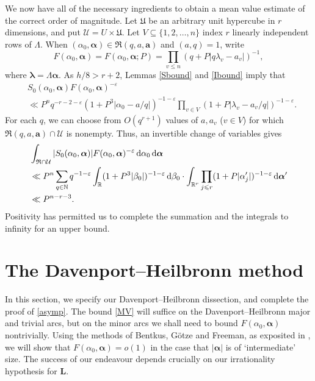 \documentclass[12pt,reqno]{amsart}
\theoremstyle{definition}
\theoremstyle{remark}
\numberwithin{equation}{section}
\begin{document}
We now have all of the necessary ingredients to obtain a mean value estimate of the correct order of magnitude. Let ${\mathfrak U}$ be an arbitrary unit hypercube in $r$ dimensions, and put ${\mathcal U} = U \times {\mathfrak U}$. Let $V \subseteq \{1,2,\ldots,n\}$ index $r$ linearly independent rows of ${{\Lambda}}$. When $({{\alpha}}_0,{\boldsymbol{{\alpha}}}) \in {\mathfrak R}(q,a,{\mathbf a})$ and $(a,q) = 1$, write
\[
F({{\alpha}}_0, {\boldsymbol{{\alpha}}}) = F({{\alpha}}_0, {\boldsymbol{{\alpha}}}; P) = \prod_{v {\leqslant} n} (q+ P | q {{\lambda}}_v - a_v|)^{-1}, 
\]
where ${{\boldsymbol {{\lambda}}}} = {{\Lambda}} {\boldsymbol{{\alpha}}}$. As $h/8 > r+2$, Lemmas \ref{Sbound} and \ref{Ibound} imply that
\begin{align*}
&S_0({{\alpha}}_0, {\boldsymbol{{\alpha}}}) F({{\alpha}}_0,{\boldsymbol{{\alpha}}})^{-{\varepsilon}} \\
&\ll P^n q^{-r-2-{\varepsilon}} (1+P^3|{{\alpha}}_0 - a/q|)^{-1-{\varepsilon}} 
\prod_{v \in  V} (1+ P|{{\lambda}}_v - a_v/q|)^{-1-{\varepsilon}}.
\end{align*}
For each $q$, we can choose from $O(q^{r+1})$ values of $a, a_v$ ($v \in V$) for which ${\mathfrak R}(q,a,{\mathbf a}) \cap {\mathcal U}$ is nonempty. Thus, an invertible change of variables gives
\begin{align}
\notag &\int_{{\mathfrak R} \cap {\mathcal U}} |S_0({{\alpha}}_0,{\boldsymbol{{\alpha}}})| F({{\alpha}}_0, {\boldsymbol{{\alpha}}})^{-{\varepsilon}} {{\,{\rm d}}} {{\alpha}}_0 {{\,{\rm d}}} {\boldsymbol{{\alpha}}} \\
\notag &\ll P^n \sum_{q \in {\mathbb N}} q^{-1-{\varepsilon}} \int_{\mathbb R} (1+P^3|{{\beta}}_0|)^{-1-{\varepsilon}} {{\,{\rm d}}} {{\beta}}_0 \cdot
\int_{{\mathbb R}^r} \prod_{j {\leqslant} r} (1+P|{{\alpha}}'_j|)^{-1-{\varepsilon}} {{\,{\rm d}}} {\boldsymbol{{\alpha}}}' \\
\label{MV} &\ll P^{n-r-3}.
\end{align}
Positivity has permitted us to complete the summation and the integrals to infinity for an upper bound.

\section{The Davenport--Heilbronn method}
\label{DHmethod}

In this section, we specify our Davenport--Heilbronn dissection, and complete the proof of \eqref{asymp}. The bound \eqref{MV} will suffice on the Davenport--Heilbronn major and trivial arcs, but on the minor arcs we shall need to bound $F({{\alpha}}_0,{\boldsymbol{{\alpha}}})$ nontrivially. Using the methods of Bentkus, G\"otze and Freeman, as exposited in \cite[Lemmas 2.2 and 2.3]{Woo2003}, we will show that $F({{\alpha}}_0, {\boldsymbol{{\alpha}}}) = o(1)$ in the case that $|{\boldsymbol{{\alpha}}}|$ is of `intermediate' size. The success of our endeavour depends crucially on our irrationality hypothesis for ${\mathbf L}$. 
\end{document}
